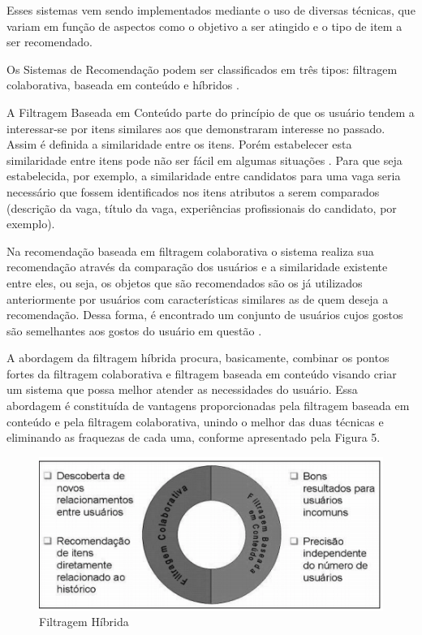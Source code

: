 \documentclass[conference]{IEEEtran}
\begin{document}
    Esses sistemas vem sendo implementados mediante o uso de diversas técnicas, que variam em função de aspectos como o objetivo a ser atingido e o tipo de item a ser recomendado.
    
    Os Sistemas de Recomendação podem ser classificados em três tipos: filtragem colaborativa, baseada em conteúdo e híbridos \cite{sistema_recomendacao_3}. 
    
    A Filtragem Baseada em Conteúdo parte do princípio de que os usuário tendem a interessar-se por itens similares aos que demonstraram interesse no passado. Assim é definida a similaridade entre os itens.  Porém estabelecer esta similaridade entre itens pode não ser fácil em algumas situações \cite{sistema_recomendacao_content}. Para que seja estabelecida, por exemplo, a similaridade entre candidatos para uma vaga seria necessário que fossem identificados nos itens atributos a serem comparados (descrição da vaga, título da vaga, experiências profissionais do candidato, por exemplo).
    
    Na recomendação baseada em filtragem colaborativa o sistema realiza sua recomendação através da comparação dos usuários e a similaridade existente entre eles, ou seja, os objetos que são recomendados são os já utilizados anteriormente por usuários com características similares as de quem deseja a recomendação. Dessa forma, é encontrado um conjunto de usuários cujos gostos são semelhantes aos gostos do usuário em questão \cite{sistema_recomendacao_content}.
    
    A abordagem da filtragem híbrida procura, basicamente, combinar os pontos fortes da filtragem colaborativa e filtragem baseada em conteúdo visando criar um sistema que possa melhor atender as necessidades do usuário. Essa abordagem é constituída de vantagens proporcionadas pela filtragem baseada em conteúdo e pela filtragem colaborativa, unindo o melhor das duas técnicas e eliminando as fraquezas de cada uma, conforme apresentado pela Figura 5.

\begin{figure}[htbp]
	\centerline{\includegraphics[scale=.5]{imagens/filtragem_hibrida.png}}
	\caption{ Filtragem Híbrida}
	\label{fig}
	\end{figure}
\end{document}
